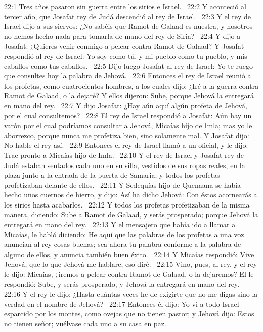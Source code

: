 22:1 Tres años pasaron sin guerra entre los sirios e Israel.  
22:2 Y aconteció al tercer año, que Josafat rey de Judá descendió al rey de Israel.  
22:3 Y el rey de Israel dijo a sus siervos: ¿No sabéis que Ramot de Galaad es nuestra, y nosotros no hemos hecho nada para tomarla de mano del rey de Siria?  
22:4 Y dijo a Josafat: ¿Quieres venir conmigo a pelear contra Ramot de Galaad? Y Josafat respondió al rey de Israel: Yo soy como tú, y mi pueblo como tu pueblo, y mis caballos como tus caballos.  
22:5 Dijo luego Josafat al rey de Israel: Yo te ruego que consultes hoy la palabra de Jehová.  
22:6 Entonces el rey de Israel reunió a los profetas, como cuatrocientos hombres, a los cuales dijo: ¿Iré a la guerra contra Ramot de Galaad, o la dejaré? Y ellos dijeron: Sube, porque Jehová la entregará en mano del rey.  
22:7 Y dijo Josafat: ¿Hay aún aquí algún profeta de Jehová, por el cual consultemos?  
22:8 El rey de Israel respondió a Josafat: Aún hay un varón por el cual podríamos consultar a Jehová, Micaías hijo de Imla; mas yo le aborrezco, porque nunca me profetiza bien, sino solamente mal. Y Josafat dijo: No hable el rey así.  
22:9 Entonces el rey de Israel llamó a un oficial, y le dijo: Trae pronto a Micaías hijo de Imla.  
22:10 Y el rey de Israel y Josafat rey de Judá estaban sentados cada uno en su silla, vestidos de sus ropas reales, en la plaza junto a la entrada de la puerta de Samaria; y todos los profetas profetizaban delante de ellos.  
22:11 Y Sedequías hijo de Quenaana se había hecho unos cuernos de hierro, y dijo: Así ha dicho Jehová: Con éstos acornearás a los sirios hasta acabarlos.  
22:12 Y todos los profetas profetizaban de la misma manera, diciendo: Sube a Ramot de Galaad, y serás prosperado; porque Jehová la entregará en mano del rey.  
22:13 Y el mensajero que había ido a llamar a Micaías, le habló diciendo: He aquí que las palabras de los profetas a una voz anuncian al rey cosas buenas; sea ahora tu palabra conforme a la palabra de alguno de ellos, y anuncia también buen éxito.  
22:14 Y Micaías respondió: Vive Jehová, que lo que Jehová me hablare, eso diré.  
22:15 Vino, pues, al rey, y el rey le dijo: Micaías, ¿iremos a pelear contra Ramot de Galaad, o la dejaremos? El le respondió: Sube, y serás prosperado, y Jehová la entregará en mano del rey.  
22:16 Y el rey le dijo: ¿Hasta cuántas veces he de exigirte que no me digas sino la verdad en el nombre de Jehová?  
22:17 Entonces él dijo: Yo vi a todo Israel esparcido por los montes, como ovejas que no tienen pastor; y Jehová dijo: Estos no tienen señor; vuélvase cada uno a su casa en paz.  
